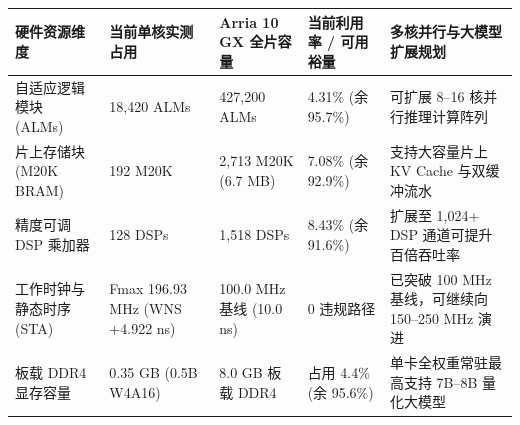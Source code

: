 \documentclass[11pt,a4paper]{article}
\begin{document}
{\footnotesize\renewcommand{\arraystretch}{1.14}\begin{longtable}{@{}L{0.19\textwidth}L{0.16\textwidth}L{0.16\textwidth}L{0.15\textwidth}L{0.24\textwidth}@{}}\toprule

\textbf{硬件资源维度} & \textbf{当前单核实测占用} & \textbf{Arria 10 GX 全片容量} & \textbf{当前利用率 /\allowbreak{} 可用裕量} & \textbf{多核并行与大模型扩展规划}\\\midrule\endhead

自适应逻辑模块 (\allowbreak{}ALMs)\allowbreak{} & 18,\allowbreak{}420 ALMs & 427,\allowbreak{}200 ALMs & 4.31\% (\allowbreak{}余 95.7\%)\allowbreak{} & 可扩展 8–16 核并行推理计算阵列\\[2pt]

片上存储块 (\allowbreak{}M20K BRAM)\allowbreak{} & 192 M20K & 2,\allowbreak{}713 M20K (\allowbreak{}6.7 MB)\allowbreak{} & 7.08\% (\allowbreak{}余 92.9\%)\allowbreak{} & 支持大容量片上 KV Cache 与双缓冲流水\\[2pt]

精度可调 DSP 乘加器 & 128 DSPs & 1,\allowbreak{}518 DSPs & 8.43\% (\allowbreak{}余 91.6\%)\allowbreak{} & 扩展至 1,\allowbreak{}024+\allowbreak{} DSP 通道可提升百倍吞吐率\\[2pt]

工作时钟与静态时序 (\allowbreak{}STA)\allowbreak{} & Fmax 196.93 MHz (\allowbreak{}WNS +\allowbreak{}4.922 ns)\allowbreak{} & 100.0 MHz 基线 (\allowbreak{}10.0 ns)\allowbreak{} & 0 违规路径 & 已突破 100 MHz 基线，可继续向 150–250 MHz 演进\\[2pt]

板载 DDR4 显存容量 & 0.35 GB (\allowbreak{}0.5B W4A16)\allowbreak{} & 8.0 GB 板载 DDR4 & 占用 4.4\% (\allowbreak{}余 95.6\%)\allowbreak{} & 单卡全权重常驻最高支持 7B–8B 量化大模型\\[2pt]

\bottomrule\end{longtable}}
\end{document}
